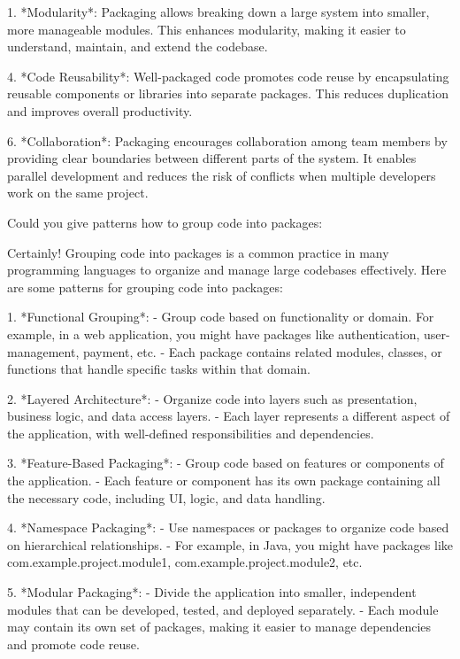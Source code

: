 1. *Modularity*: Packaging allows breaking down a large system into smaller, more manageable modules. This enhances modularity, making it easier to understand, maintain, and extend the codebase.



4. *Code Reusability*: Well-packaged code promotes code reuse by encapsulating reusable components or libraries into separate packages. This reduces duplication and improves overall productivity.

6. *Collaboration*: Packaging encourages collaboration among team members by providing clear boundaries between different parts of the system. It enables parallel development and reduces the risk of conflicts when multiple developers work on the same project.





Could you give patterns how to group code into packages:

Certainly! Grouping code into packages is a common practice in many programming languages to organize and manage large codebases effectively. Here are some patterns for grouping code into packages:

1. *Functional Grouping*:
- Group code based on functionality or domain. For example, in a web application, you might have packages like authentication, user-management, payment, etc.
- Each package contains related modules, classes, or functions that handle specific tasks within that domain.

2. *Layered Architecture*:
- Organize code into layers such as presentation, business logic, and data access layers.
- Each layer represents a different aspect of the application, with well-defined responsibilities and dependencies.

3. *Feature-Based Packaging*:
- Group code based on features or components of the application.
- Each feature or component has its own package containing all the necessary code, including UI, logic, and data handling.

4. *Namespace Packaging*:
- Use namespaces or packages to organize code based on hierarchical relationships.
- For example, in Java, you might have packages like com.example.project.module1, com.example.project.module2, etc.

5. *Modular Packaging*:
- Divide the application into smaller, independent modules that can be developed, tested, and deployed separately.
- Each module may contain its own set of packages, making it easier to manage dependencies and promote code reuse.

